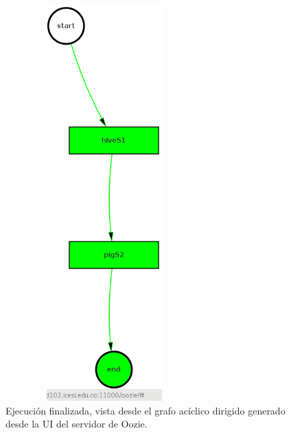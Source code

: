 \begin{figure}[H]
  \centering
      \includegraphics[width=3.0in, height=6.0in]{fig/06/03}
  \caption{Ejecución finalizada, vista desde el grafo acíclico dirigido generado desde la UI del servidor de Oozie.}
\end{figure}